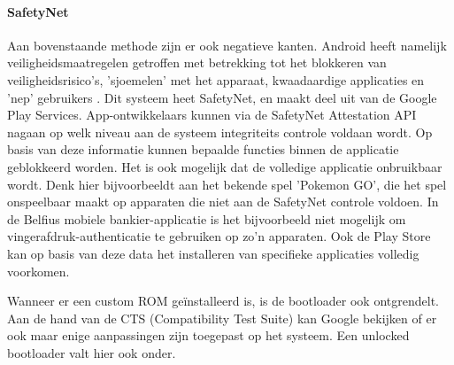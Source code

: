\paragraph*{SafetyNet}

Aan bovenstaande methode zijn er ook negatieve kanten. Android heeft namelijk veiligheidsmaatregelen getroffen met betrekking tot het blokkeren van veiligheidsrisico's, 'sjoemelen' met het apparaat, kwaadaardige applicaties en 'nep' gebruikers \autocite{android_safetynet}. Dit systeem heet SafetyNet, en maakt deel uit van de Google Play Services. App-ontwikkelaars kunnen via de SafetyNet Attestation API nagaan op welk niveau aan de systeem integriteits controle voldaan wordt. Op basis van deze informatie kunnen bepaalde functies binnen de applicatie geblokkeerd worden. Het is ook mogelijk dat de volledige applicatie onbruikbaar wordt. Denk hier bijvoorbeeldt aan het bekende spel 'Pokemon GO', die het spel onspeelbaar maakt op apparaten die niet aan de SafetyNet controle voldoen. In de Belfius mobiele bankier-applicatie is het bijvoorbeeld niet mogelijk om vingerafdruk-authenticatie te gebruiken op zo'n apparaten. Ook de Play Store kan op basis van deze data het installeren van specifieke applicaties volledig voorkomen.

Wanneer er een custom ROM geïnstalleerd is, is de bootloader ook ontgrendelt. Aan de hand van de CTS (Compatibility Test Suite) kan Google bekijken of er ook maar enige aanpassingen zijn toegepast op het systeem. Een unlocked bootloader valt hier ook onder.




